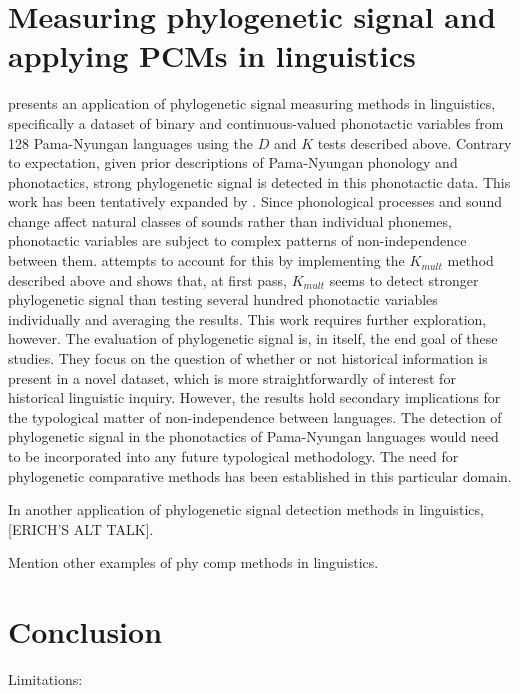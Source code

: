 \hypertarget{applications}{%
\section{Measuring phylogenetic signal and applying PCMs in linguistics}\label{applications}}

\textcite{macklin-cordes_phylogenetic_2020} presents an application of phylogenetic signal measuring methods in linguistics, specifically a dataset of binary and continuous-valued phonotactic variables from 128 Pama-Nyungan languages using the \(D\) and \(K\) tests described above. Contrary to expectation, given prior descriptions of Pama-Nyungan phonology and phonotactics, strong phylogenetic signal is detected in this phonotactic data. This work has been tentatively expanded by \textcite{macklin-cordes_phylogeny_2018}. Since phonological processes and sound change affect natural classes of sounds rather than individual phonemes, phonotactic variables are subject to complex patterns of non-independence between them. \textcite{macklin-cordes_phylogeny_2018} attempts to account for this by implementing the \(K_{mult}\) method described above and shows that, at first pass, \(K_{mult}\) seems to detect stronger phylogenetic signal than testing several hundred phonotactic variables individually and averaging the results. This work requires further exploration, however. The evaluation of phylogenetic signal is, in itself, the end goal of these studies. They focus on the question of whether or not historical information is present in a novel dataset, which is more straightforwardly of interest for historical linguistic inquiry. However, the results hold secondary implications for the typological matter of non-independence between languages. The detection of phylogenetic signal in the phonotactics of Pama-Nyungan languages would need to be incorporated into any future typological methodology. The need for phylogenetic comparative methods has been established in this particular domain.

In another application of phylogenetic signal detection methods in linguistics, {[}ERICH'S ALT TALK{]}.

Mention other examples of phy comp methods in linguistics.

\hypertarget{concl}{%
\section{Conclusion}\label{concl}}

Limitations:


